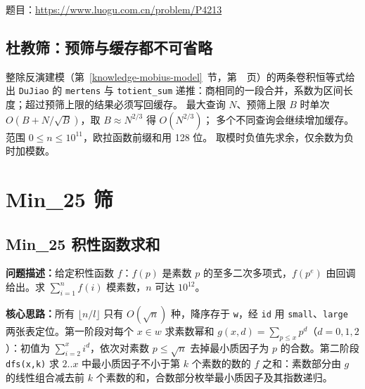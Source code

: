 题目：\url{https://www.luogu.com.cn/problem/P4213}



\subsection{杜教筛：预筛与缓存都不可省略}\label{knowledge-dujiao}
整除反演建模（第~\ref{knowledge-mobius-model}~节，第~\pageref{knowledge-mobius-model}~页）的两条卷积恒等式给出 \texttt{DuJiao} 的
\texttt{mertens} 与 \texttt{totient\_sum} 递推：商相同的一段合并，系数为区间长度；超过预筛上限的结果必须写回缓存。
最大查询 $N$、预筛上限 $B$ 时单次 $O(B+N/\sqrt B)$，取 $B\approx N^{2/3}$ 得 $O(N^{2/3})$；
多个不同查询会继续增加缓存。范围 $0\le n\le10^{11}$，欧拉函数前缀和用 128 位。
取模时负值先求余，仅余数为负时加模数。



\newpage

\section{Min\_25 筛}

\subsection{Min\_25 积性函数求和}\label{compact-Min25}

\noindent\textbf{问题描述：}\allowbreak 给定积性函数 $f$：$f(p)$ 是素数 $p$ 的至多二次多项式，$f(p^e)$ 由回调给出。求 $\sum_{i=1}^{n}f(i)$ 模素数，$n$ 可达 $10^{12}$。

\textbf{核心思路：}\allowbreak 所有 $\lfloor n/l\rfloor$ 只有 $O(\sqrt n)$ 种，降序存于 \texttt{w}，经 \texttt{id} 用 \texttt{small}、\texttt{large} 两张表定位。第一阶段对每个 $x\in w$ 求素数幂和 $g(x,d)=\sum_{p\le x}p^d$（$d=0,1,2$）：初值为 $\sum_{i=2}^{x}i^d$，依次对素数 $p\le\sqrt n$ 去掉最小质因子为 $p$ 的合数。第二阶段 \texttt{dfs(x,k)} 求 $2..x$ 中最小质因子不小于第 $k$ 个素数的数的 $f$ 之和：素数部分由 $g$ 的线性组合减去前 $k$ 个素数的和，合数部分枚举最小质因子及其指数递归。

